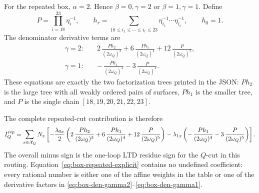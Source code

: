 \documentclass[11pt,a4paper]{report}
\newcommand{\Samples}{\mathcal X}
\begin{document}
For the repeated box, \(\alpha=2\).  Hence \(\beta=0,\gamma=2\) or
\(\beta=1,\gamma=1\).  Define
\[
  P=\prod_{i=18}^{23}\eta_i^{-1},\qquad
  h_r=\sum_{18\le i_1\le\cdots\le i_r\le 23}
       \eta_{i_1}^{-1}\cdots\eta_{i_r}^{-1},\qquad h_0=1 .
\]
The denominator derivative terms are
\begin{align}
  \gamma=2:\quad&
  2\,\frac{P h_2}{(2\omega_Q)^3}
  +6\,\frac{P h_1}{(2\omega_Q)^4}
  +12\,\frac{P}{(2\omega_Q)^5},
  \label{eq:box-den-gamma2}\\
  \gamma=1:\quad&
  -\,\frac{P h_1}{(2\omega_Q)^3}
  -3\,\frac{P}{(2\omega_Q)^4}.
  \label{eq:box-den-gamma1}
\end{align}
These equations are exactly the two factorization trees printed in the JSON:
\(P h_2\) is the large tree with all weakly ordered pairs of surfaces,
\(P h_1\) is the smaller tree, and \(P\) is the single chain
\([18,19,20,21,22,23]\).

The complete repeated-cut contribution is therefore
\begin{equation}
  I_Q^{\rm rep}
  =
  \sum_{x\in\Samples_Q}
  N_x
  \left[
    -\frac{\lambda_{0x}}{2}
    \left(
      2\,\frac{P h_2}{(2\omega_Q)^3}
      +6\,\frac{P h_1}{(2\omega_Q)^4}
      +12\,\frac{P}{(2\omega_Q)^5}
    \right)
    -\lambda_{1x}
    \left(
      -\,\frac{P h_1}{(2\omega_Q)^4}
      -3\,\frac{P}{(2\omega_Q)^5}
    \right)
  \right].
  \label{eq:box-repeated-explicit}
\end{equation}
The overall minus sign is the one-loop LTD residue sign for the \(Q\)-cut in
this routing.  Equation~\eqref{eq:box-repeated-explicit} contains no undefined
coefficient: every rational number is either one of the affine weights in the
table or one of the derivative factors in
\eqref{eq:box-den-gamma2}--\eqref{eq:box-den-gamma1}.
\end{document}
